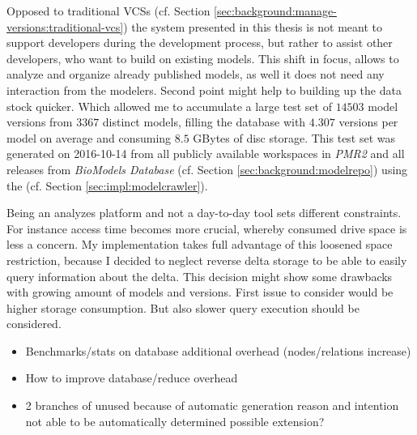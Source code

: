 
Opposed to traditional VCSs (cf. Section \ref{sec:background:manage-versions:traditional-vcs}) the system presented in this thesis is not meant to support developers during the development process, but rather to assist other developers, who want to build on existing models.
This shift in focus, allows to analyze and organize already published models, as well it does not need any interaction from the modelers. Second point might help to building up the data stock quicker.
Which allowed me to accumulate a large test set of $14503$ model versions from $3367$ distinct models, filling the database with $4.307$ versions per model on average and consuming $8.5$ GBytes of disc storage.
This test set was generated on 2016-10-14 from all publicly available workspaces in \emph{PMR2} and all releases from \emph{BioModels Database} (cf. Section \ref{sec:background:modelrepo}) using the \modelcrawler (cf. Section \ref{sec:impl:modelcrawler}).

Being an analyzes platform and not a day-to-day tool sets different constraints. For instance access time becomes more crucial, whereby consumed drive space is less a concern.
My implementation takes full advantage of this loosened space restriction, because I decided to neglect reverse delta storage to be able to easily query information about the delta. This decision might show some drawbacks with growing amount of models and versions.
First issue to consider would be higher storage consumption. But also slower query execution should be considered.



\begin{itemize}
	\item Benchmarks/stats on database
		\subitem additional overhead (nodes/relations increase)
	\item How to improve database/reduce overhead
	\item 2 branches of \comodi unused
		\subitem because of automatic generation
		\subitem reason and intention not able to be automatically determined
		\subitem possible extension?
\end{itemize}
